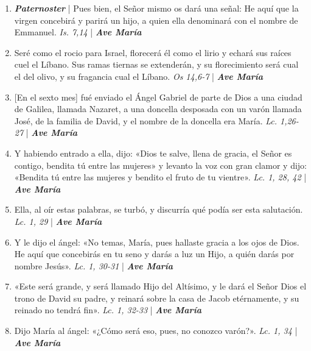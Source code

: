 \documentclass[../../devocionario.tex]{subfiles}
\begin{document}
    \begin{enumerate}
    
        \item \textbf{\textit{Paternoster}} | Pues bien, el Señor mismo os dará una señal: He aquí que la virgen concebirá y parirá un hijo, 
                a quien ella denominará con el nombre de Emmanuel. \textit{Is. 7,14} | \textbf{\textit{Ave María}}

        \item Seré como el rocio para Israel, florecerá él como el lirio y echará sus raíces cuel el Líbano. 
                Sus ramas tiernas se extenderán, y su florecimiento será cual el del olivo, y su fragancia cual el Líbano. \textit{Os 14,6-7} | \textbf{\textit{Ave María}}

        \item {[En el sexto mes]} fué enviado el Ángel Gabriel de parte de Dios a una ciudad de Galilea, llamada Nazaret, 
                a una doncella desposada con un varón llamada José, de la familia de David, y el nombre de la doncella era María. \textit{Lc. 1,26- 27} | \textbf{\textit{Ave María}}

        \item Y habiendo entrado a ella, dijo: «Dios te salve, llena de gracia, el Señor es contigo, bendita tú entre las mujeres» y 
                levanto la voz con gran clamor y dijo: «Bendita tú entre las mujeres y bendito el fruto de tu vientre». \textit{Lc. 1, 28, 42} | \textbf{\textit{Ave María}}

        \item Ella, al oír estas palabras, se turbó, y discurría qué podía ser esta salutación. \textit{Lc. 1, 29} | \textbf{\textit{Ave María}}

        \item Y le dijo el ángel: «No temas, María, pues hallaste gracia a los ojos de Dios. He aquí que concebirás en tu seno y darás a luz un Hijo, 
                a quién darás por nombre Jesús». \textit{Lc. 1, 30-31} | \textbf{\textit{Ave María}}

        \item «Este será grande, y será llamado Hijo del Altísimo, y le dará el Señor Dios el trono de David su padre, 
                y reinará sobre la casa de Jacob etérnamente, y su reinado no tendrá fin». \textit{Lc. 1, 32-33} | \textbf{\textit{Ave María}}

        \item Dijo María al ángel: «¿Cómo será eso, pues, no conozco varón?». \textit{Lc. 1, 34}  | \textbf{\textit{Ave María}}


\end{enumerate}
\end{document}
